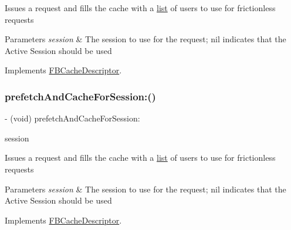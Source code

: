 Issues a request and fills the cache with a \hyperlink{protocollist-p}{list} of users to use for frictionless requests


\begin{DoxyParams}{Parameters}
{\em session} & The session to use for the request; nil indicates that the Active Session should be used \\
\hline
\end{DoxyParams}


Implements \hyperlink{interfaceFBCacheDescriptor_a1d3bbb38753d402a6f08e9402904a8d6}{F\+B\+Cache\+Descriptor}.

\mbox{\label{interfaceFBFrictionlessRecipientCache_a4f218828f2b6a8bb5a8e0044e98689dc}} 
\subsubsection{\texorpdfstring{prefetch\+And\+Cache\+For\+Session\+:()}{prefetchAndCacheForSession:()}\hspace{0.1cm}{\footnotesize\ttfamily [4/5]}}
{\footnotesize\ttfamily -\/ (void) prefetch\+And\+Cache\+For\+Session\+: \begin{DoxyParamCaption}\item[{(\hyperlink{interfaceFBSession}{F\+B\+Session} $\ast$)}]{session }\end{DoxyParamCaption}}

Issues a request and fills the cache with a \hyperlink{protocollist-p}{list} of users to use for frictionless requests


\begin{DoxyParams}{Parameters}
{\em session} & The session to use for the request; nil indicates that the Active Session should be used \\
\hline
\end{DoxyParams}


Implements \hyperlink{interfaceFBCacheDescriptor_a1d3bbb38753d402a6f08e9402904a8d6}{F\+B\+Cache\+Descriptor}.

\mbox{\label{interfaceFBFrictionlessRecipientCache_a4f218828f2b6a8bb5a8e0044e98689dc}} 
